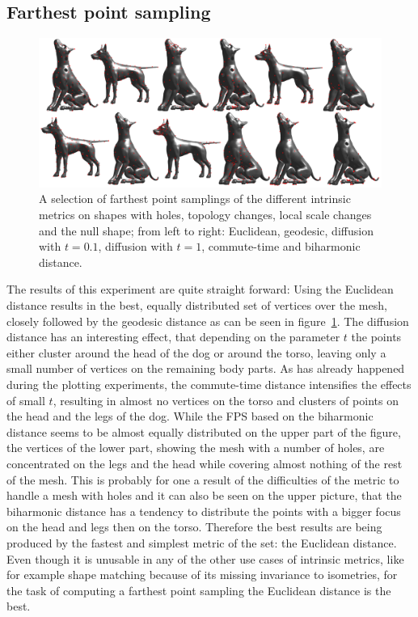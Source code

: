 \subsection{Farthest point sampling}
\begin{figure}[h]
	\centering
	\includegraphics[width = \textwidth]{../results/fps_end}
	\caption{A selection of farthest point samplings of the different intrinsic metrics on shapes with holes, topology changes, local scale changes and the null shape; from left to right: Euclidean, geodesic, diffusion with $t=0.1$, diffusion with $t=1$, commute-time and biharmonic distance.}
	\label{fig:fps_end}
\end{figure}
The results of this experiment are quite straight forward:
Using the Euclidean distance results in the best, equally distributed set of vertices over the mesh, closely followed by the geodesic distance as can be seen in figure~\ref{fig:fps_end}.
The diffusion distance has an interesting effect, that depending on the parameter $t$ the points either cluster around the head of the dog or around the torso, leaving only a small number of vertices on the remaining body parts.
As has already happened during the plotting experiments, the commute-time distance intensifies the effects of small $t$, resulting in almost no vertices on the torso and clusters of points on the head and the legs of the dog.
While the FPS based on the biharmonic distance seems to be almost equally distributed on the upper part of the figure, the vertices of the lower part, showing the mesh with a number of holes, are concentrated on the legs and the head while covering almost nothing of the rest of the mesh.
This is probably for one a result of the difficulties of the metric to handle a mesh with holes and it can also be seen on the upper picture, that the biharmonic distance has a tendency to distribute the points with a bigger focus on the head and legs then on the torso.
Therefore the best results are being produced by the fastest and simplest metric of the set: the Euclidean distance.
Even though it is unusable in any of the other use cases of intrinsic metrics, like for example shape matching because of its missing invariance to isometries, for the task of computing a farthest point sampling the Euclidean distance is the best.


